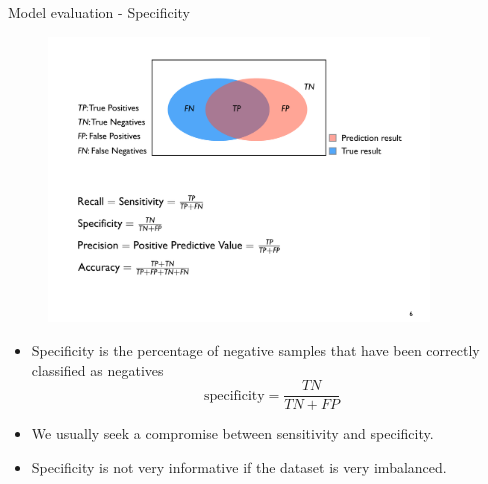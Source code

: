 \documentclass[xcolor=pdftex,dvipsnames,table]{beamer}
\begin{document}
\begin{frame}{Model evaluation - Specificity}
	\begin{figure}[htb]
		\includegraphics[width=0.9\textwidth]{../graphics/ModelEvaluation.pdf}
	\end{figure}
	\begin{itemize}	
		\item Specificity is the percentage of negative samples that have been correctly classified as negatives
		\begin{equation}
			\text{specificity} = \frac{TN}{TN + FP}
		\end{equation}
		\item We usually seek a compromise between sensitivity and specificity. 
		\item Specificity is not very informative if the dataset is very imbalanced. 
	\end{itemize}
\end{frame}
\end{document}
